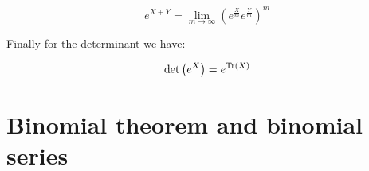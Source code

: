 \begin{eigenschap}
\[ e^{X+Y} = \lim_{m\to\infty} \left(e^{\frac{X}{m}}e^{\frac{Y}{m}}\right)^m \]
\end{eigenschap}
Finally for the determinant we have:
\begin{eigenschap}
\[\det \left(e^X\right) = e^{\operatorname{Tr}(X)}\]
\end{eigenschap}

\section{Binomial theorem and binomial series}